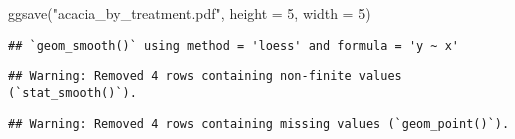 \documentclass[
]{article}
\newenvironment{Shaded}{\begin{snugshade}}{\end{snugshade}}
\newcommand{\AttributeTok}[1]{\textcolor[rgb]{0.77,0.63,0.00}{#1}}
\newcommand{\DecValTok}[1]{\textcolor[rgb]{0.00,0.00,0.81}{#1}}
\newcommand{\FunctionTok}[1]{\textcolor[rgb]{0.00,0.00,0.00}{#1}}
\newcommand{\NormalTok}[1]{#1}
\newcommand{\StringTok}[1]{\textcolor[rgb]{0.31,0.60,0.02}{#1}}
\begin{document}
\begin{Shaded}
\begin{Highlighting}[]
\FunctionTok{ggsave}\NormalTok{(}\StringTok{"acacia\_by\_treatment.pdf"}\NormalTok{, }\AttributeTok{height =} \DecValTok{5}\NormalTok{, }\AttributeTok{width =} \DecValTok{5}\NormalTok{)}
\end{Highlighting}
\end{Shaded}

\begin{verbatim}
## `geom_smooth()` using method = 'loess' and formula = 'y ~ x'
\end{verbatim}

\begin{verbatim}
## Warning: Removed 4 rows containing non-finite values (`stat_smooth()`).
\end{verbatim}

\begin{verbatim}
## Warning: Removed 4 rows containing missing values (`geom_point()`).
\end{verbatim}
\end{document}
